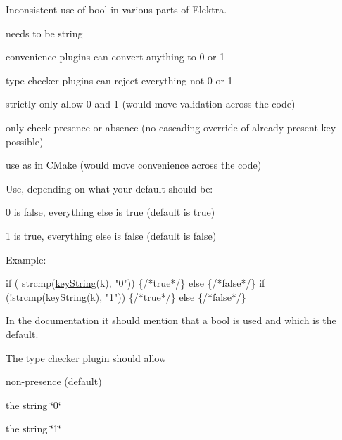 Inconsistent use of bool in various parts of Elektra.


\begin{DoxyItemize}
\item needs to be string
\item convenience plugins can convert anything to 0 or 1
\item type checker plugins can reject everything not 0 or 1
\end{DoxyItemize}


\begin{DoxyItemize}
\item strictly only allow 0 and 1 (would move validation across the code)
\item only check presence or absence (no cascading override of already present key possible)
\item use as in C\+Make (would move convenience across the code)
\end{DoxyItemize}

Use, depending on what your default should be\+:


\begin{DoxyItemize}
\item 0 is false, everything else is true (default is true)
\item 1 is true, everything else is false (default is false)
\end{DoxyItemize}

Example\+:


\begin{DoxyCode}
\textcolor{keywordflow}{if} ( strcmp(\hyperlink{group__keyvalue_ga880936f2481d28e6e2acbe7486a21d05}{keyString}(k), \textcolor{stringliteral}{"0"})) \{\textcolor{comment}{/*true*/}\} \textcolor{keywordflow}{else} \{\textcolor{comment}{/*false*/}\}
\textcolor{keywordflow}{if} (!strcmp(\hyperlink{group__keyvalue_ga880936f2481d28e6e2acbe7486a21d05}{keyString}(k), \textcolor{stringliteral}{"1"})) \{\textcolor{comment}{/*true*/}\} \textcolor{keywordflow}{else} \{\textcolor{comment}{/*false*/}\}
\end{DoxyCode}


In the documentation it should mention that a bool is used and which is the default.

The type checker plugin should allow


\begin{DoxyItemize}
\item non-\/presence (default)
\item the string \char`\"{}0\char`\"{}
\item the string \char`\"{}1\char`\"{}
\end{DoxyItemize}

